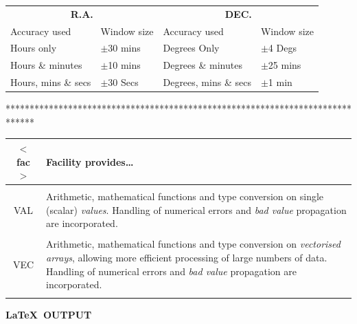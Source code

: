 \documentclass[twoside,11pt]{starlink}
\begin{document}
\begin{footnotesize}
\begin{terminalv}
\begin{table}
  \begin{center}
    \begin{tabular}{|ll|ll|} \hline
      \multicolumn{2}{|c|}{\textbf{R.A.}}&\multicolumn{2}{c|}{\textbf{DEC.}} \\
      Accuracy used &Window size&Accuracy used &Window size\\ \hline
      Hours only&$\pm$30 mins&Degrees Only&$\pm$4 Degs\\
      Hours \& minutes&$\pm$10 mins&Degrees \& minutes &$\pm$25 mins\\
      Hours, mins \& secs&$\pm$30 Secs&Degrees, mins \& secs&$\pm$1 min\\ \hline
    \end{tabular}
  \end{center}
\end{table}

******************************************************************************

\begin{center}
  \begin{tabular}{c|p{33em}}
    \textbf{$<$fac$>$} & \textbf{Facility provides\ldots } \\
    \hline
    \\
    VAL & Arithmetic, mathematical functions and type conversion on single
    (scalar) \emph{values}.
    Handling of numerical errors and \emph{bad value} propagation are
    incorporated.\\
    \\
    VEC & Arithmetic, mathematical functions and type conversion on \emph{vectorised arrays},
          allowing more efficient processing of large numbers of
    data.
    Handling of numerical errors and \emph{bad value} propagation are
    incorporated.\\
    \\
  \end{tabular}
\end{center}
\end{terminalv}
\end{footnotesize}

\newpage

\begin{center}
  \textbf{\LaTeX\ OUTPUT}
\end{center}
\end{document}
